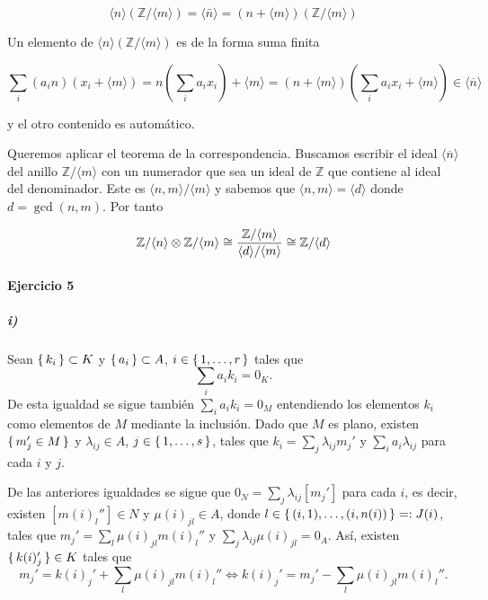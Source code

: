\documentclass[./ejercicios.tex]{subfiles}
\begin{document}
\begin{equation}
  \langle n \rangle  (\mathbb{Z}/ \langle m \rangle) = \langle \bar n \rangle = (n+\langle m  \rangle) ( \mathbb Z / \langle m\rangle )
\end{equation}

Un elemento de $\langle n \rangle  (\mathbb{Z}/ \langle m \rangle) $ es de la forma suma finita

\begin{equation}
\sum_i (a_i n ) (x_i + \langle m \rangle)  = n(  \sum_i a_i x_i) + \langle m \rangle  = (n+ \langle m \rangle)  ( \sum_i a_i x_i + \langle m \rangle) \in \langle \overline n \rangle
\end{equation}

y el otro contenido es automático.

Queremos aplicar el teorema de la correspondencia. Buscamos escribir el ideal $\langle \overline{n} \rangle $ del anillo ${ \mathbb Z}/ \langle m \rangle$ con un numerador que sea un ideal de ${ \mathbb Z}$ que contiene al ideal del denominador. Este es $\langle n,m \rangle / \langle m \rangle$ y sabemos que $\langle n,m \rangle = \langle d \rangle$ donde $d= \gcd(n,m)$. Por tanto

\begin{equation}
  \mathbb{Z}/\langle n\rangle \otimes \mathbb{Z} / \langle m \rangle \cong \frac{\mathbb{Z} / \langle m \rangle }{ \langle d \rangle / \langle m\rangle } \cong \mathbb{Z} / \langle d \rangle
\end{equation}

\paragraph{Ejercicio 5}
\subparagraph{i)} Sean $\set{k_i}\subset K$ y $\set{a_i}\subset A$, $i\in\set{1,\dots,r}$ tales que
$$\sum_{i}a_ik_i=0_K.$$
De esta igualdad se sigue también $\sum_{i}a_ik_i=0_M$ entendiendo los elementos $k_i$ como elementos de $M$ mediante la inclusión. Dado que $M$ es plano, existen $\set{m_j'\in M}$ y $\lambda_{ij}\in A$, $j\in\set{1,\dots, s}$, tales que $k_i=\sum_j\lambda_{ij}m_j'$ y $\sum_i a_i\lambda_{ij}$ para cada $i$ y $j$. 

De las anteriores igualdades se sigue que $0_N=\sum_j\lambda_{ij}[m_j']$ para cada $i$, es decir, existen $[m(i)_{l}'']\in N$ y $\mu(i)_{jl}\in A$, donde $l\in\set{(i,1),\dots,(i,n(i))}=:J(i)$, tales que $m_j'=\sum_l\mu(i)_{jl}m(i)_l''$ y $\sum_{j}\lambda_{ij}\mu(i)_{jl}=0_A.$ Así, existen $\set{k(i)_j'}\in K$ tales que
$$m_j'=k(i)_j'+\sum_l\mu(i)_{jl}m(i)_l''\Longleftrightarrow k(i)_j'=m_{j}'-\sum_{l}\mu(i)_{jl}m(i)_l''.$$
\end{document}
